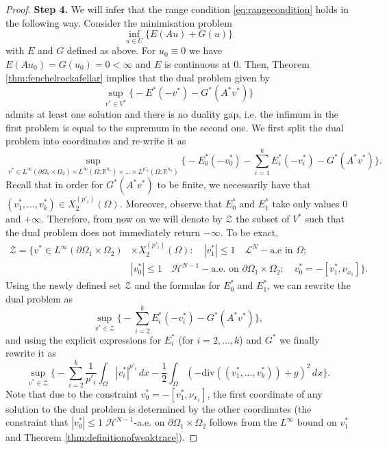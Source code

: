 \documentclass[reqno,12pt]{amsart}
\numberwithin{equation}{section}
\begin{document}
\begin{proof}
{\flushleft \bf Step 4.} We will infer that the range condition \eqref{eq:rangecondition} holds in the following way. Consider the minimisation problem
\begin{equation}\label{eq:mimimisationofeg}
\inf_{u \in U} \bigg\{ E(Au) + G(u) \bigg\}
\end{equation}
with $E$ and $G$ defined as above. For $u_0 \equiv 0$ we have $E(Au_0) = G(u_0) = 0 < \infty$ and $E$ is continuous at $0$. Then, Theorem \ref{thm:fenchelrockafellar} implies that the dual problem given by
\begin{equation}
\sup_{v^* \in V^*} \bigg\{ - E^*(-v^*) - G^*(A^* v^*) \bigg\}
\end{equation}
admits at least one solution and there is no duality gap, i.e. the infimum in the first problem is equal to the supremum in the second one. We first split the dual problem into coordinates and re-write it as
\begin{equation}
\sup_{v^* \in L^\infty(\partial\Omega_1 \times \Omega_2) \times L^\infty(\Omega; \mathbb{R}^{n_1}) \times ... \times L^{p'_k}(\Omega; \mathbb{R}^{n_k})} \bigg\{ - E_0^*(-v_0^*) - \sum_{i=1}^k E_i^*(-v_i^*) - G^*(A^* v^*) \bigg\}.
\end{equation}
Recall that in order for $G^*(A^* v^*)$ to be finite, we necessarily have that $(v_1^*, ..., v_k^*) \in X_2^{(p'_i)}(\Omega)$. Moreover, observe that $E_0^*$ and $E_1^*$ take only values $0$ and $+\infty$. Therefore, from now on we will denote by $\mathcal{Z}$ the subset of $V^*$ such that the dual problem does not immediately return $-\infty$. To be exact,
\begin{align}
\mathcal{Z} = \bigg\{ v^* \in L^\infty(\partial\Omega_1 \times \Omega_2) &\times X_2^{(p'_i)}(\Omega): \quad |v_1^*| \leq 1 \quad \mathcal{L}^N-\mbox{a.e in } \Omega; \\
& |v_0^*| \leq 1 \quad \mathcal{H}^{N-1}-\mbox{a.e. on } \partial\Omega_1 \times \Omega_2; \quad v_0^* = -[v_1^*, \nu_{x_1}] \bigg\}.
\end{align}
Using the newly defined set $\mathcal{Z}$ and the formulas for $E_0^*$ and $E_1^*$, we can rewrite the dual problem as
\begin{equation}
\sup_{v^* \in \mathcal{Z}} \bigg\{ - \sum_{i = 2}^k E_i^*(-v_i^*) - G^*(A^* v^*) \bigg\},
\end{equation}
and using the explicit expressions for $E_i^*$ (for $i = 2,...,k$) and $G^*$ we finally rewrite it as
\begin{equation}
\sup_{v^* \in \mathcal{Z}} \bigg\{ - \sum_{i = 2}^k \frac{1}{p'_i} \int_\Omega |v_i^*|^{p'_i} \, dx - \frac12 \int_\Omega ( -\mathrm{div}((v_1^*,...,v_k^*))  + g)^2 \, dx \bigg\}.
\end{equation}
Note that due to the constraint $v_0^* = - [v_1^*, \nu_{x_1}]$, the first coordinate of any solution to the dual problem is determined by the other coordinates (the constraint that $|v_0^*| \leq 1$ $\mathcal{H}^{N-1}$-a.e. on $\partial\Omega_1 \times \Omega_2$ follows from the $L^\infty$ bound on $v_1^*$ and Theorem \ref{thm:definitionofweaktrace}). 



\end{proof}
\end{document}
